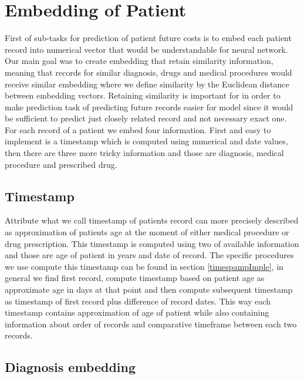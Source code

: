 
\section{Embedding of Patient}
\label{embedding}

First of sub-tasks for prediction of patient future costs is to embed each patient record into numerical vector that would be understandable for neural network. Our main goal was to create embedding that retain similarity information, meaning that records for similar diagnosis, drugs and medical procedures would receive similar embedding where we define similarity by the Euclidean distance between embedding vectors. Retaining similarity is important for in order to make prediction task of predicting future records easier for model since it would be sufficient to predict just closely related record and not necessary exact one. 
\\

For each record of a patient we embed four information. First and easy to implement is a timestamp which is computed using numerical and date values, then there are three more tricky information and those are diagnosis, medical procedure and prescribed drug. 

\subsection{Timestamp}

Attribute what we call timestamp of patients record can more precisely described as approximation of patients age at the moment of either medical procedure or drug prescription. This timestamp is computed using two of available information and those are age of patient in years and date of record. The specific procedures we use compute this timestamp can be found in section \ref{timespampImple}, in general we find first record, compute timestamp based on patient age as approximate age in days at that point and then compute subsequent timestamp as timestamp of first record plus difference of record dates. This way each timestamp contains approximation of age of patient while also containing information about order of records and comparative timeframe between each two records.

\subsection{Diagnosis embedding}
\label{diagEmb}


